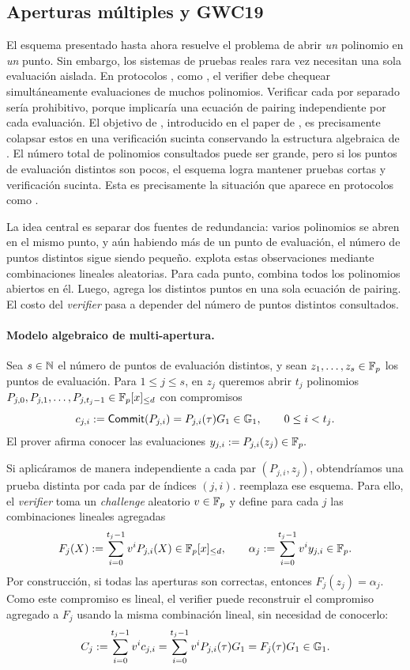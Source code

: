 \subsection{Aperturas múltiples y GWC19}
\label{subsec:kzg-gwc19}

El esquema \KZG presentado hasta ahora resuelve el problema de abrir \emph{un} polinomio en \emph{un} punto. Sin embargo, los sistemas de pruebas reales rara vez necesitan una sola evaluación aislada. En protocolos \PLONKish, como \HaloTwo, el verifier debe chequear simultáneamente evaluaciones de muchos polinomios. Verificar cada \Open por separado sería prohibitivo, porque implicaría una ecuación de pairing independiente por cada evaluación. El objetivo de \GWCNineteen, introducido en el paper de \PLONK \cite{cryptoeprint:2019/953}, es precisamente colapsar estos \Open en una verificación sucinta conservando la estructura algebraica de \KZG. El número total de polinomios consultados puede ser grande, pero si los puntos de evaluación distintos son pocos, el esquema logra mantener pruebas cortas y verificación sucinta. Esta es precisamente la situación que aparece en protocolos \PLONKish como \HaloTwo.

La idea central es separar dos fuentes de redundancia: varios polinomios se abren en el mismo punto, y aún habiendo más de un punto de evaluación, el número de puntos distintos sigue siendo pequeño. \GWCNineteen explota estas observaciones mediante combinaciones lineales aleatorias. Para cada punto, combina todos los polinomios abiertos en él. Luego, agrega los distintos puntos en una sola ecuación de pairing. El costo del \textit{verifier} pasa a depender del número de puntos distintos consultados.

\paragraph{Modelo algebraico de multi-apertura.}
Sea $s \in \mathbb{N}$ el número de puntos de evaluación distintos, y sean $z_1, \ldots, z_s \in \mathbb{F}_p$ los puntos de evaluación. Para $1 \leq j \leq s$, en $z_j$ queremos abrir $t_j$ polinomios $P_{j,0}, P_{j,1}, \ldots, P_{j,t_j-1} \in \mathbb{F}_p[x]_{\leq d}$ con compromisos
$$c_{j,i} := \mathsf{Commit}(P_{j,i}) = P_{j,i}(\tau)G_1 \in \mathbb{G}_1, \qquad 0 \leq i < t_j.$$
El prover afirma conocer las evaluaciones $y_{j,i} := P_{j,i}(z_j) \in \mathbb{F}_p.$

Si aplicáramos \KZG de manera independiente a cada par $(P_{j,i}, z_j)$, obtendríamos una prueba distinta por cada par de índices $(j, i)$. \GWCNineteen reemplaza ese esquema. Para ello, el \textit{verifier} toma un \textit{challenge} aleatorio $v \in \mathbb{F}_p$ y define para cada $j$ las combinaciones lineales agregadas
$$F_j(X) := \sum_{i=0}^{t_j-1} v^i P_{j,i}(X) \in \mathbb{F}_p[x]_{\leq d}, \qquad \alpha_j := \sum_{i=0}^{t_j-1} v^i y_{j,i} \in \mathbb{F}_p.$$
Por construcción, si todas las aperturas son correctas, entonces $F_j(z_j) = \alpha_j$. Como este compromiso es lineal, el verifier puede reconstruir el compromiso agregado a $F_j$ usando la misma combinación lineal, sin necesidad de conocerlo:
$$C_j := \sum_{i=0}^{t_j-1} v^i c_{j,i} = \sum_{i=0}^{t_j-1} v^i P_{j,i}(\tau)G_1 = F_j(\tau)G_1 \in \mathbb{G}_1.$$


